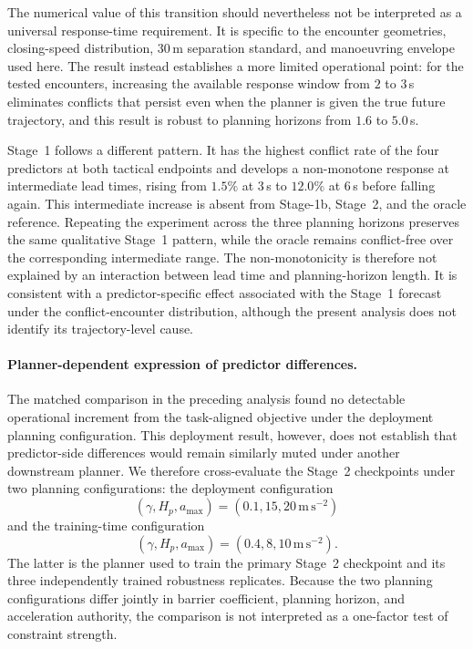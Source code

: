 \documentclass[11pt]{article}
\theoremstyle{plain}
\theoremstyle{definition}
\begin{document}
The numerical value of this transition should nevertheless not be
interpreted as a universal response-time requirement. It is specific
to the encounter geometries, closing-speed distribution, $30$\,m
separation standard, and manoeuvring envelope used here. The result
instead establishes a more limited operational point: for the tested
encounters, increasing the available response window from $2$ to
$3$\,s eliminates conflicts that persist even when the planner is
given the true future trajectory, and this result is robust to planning
horizons from $1.6$ to $5.0$\,s.

Stage~1 follows a different pattern. It has the highest conflict rate
of the four predictors at both tactical endpoints and develops a
non-monotone response at intermediate lead times, rising from
$1.5\%$ at $3$\,s to $12.0\%$ at $6$\,s before falling again.
This intermediate increase is absent from Stage-1b, Stage~2, and the
oracle reference. Repeating the experiment across the three planning
horizons preserves the same qualitative Stage~1 pattern, while the
oracle remains conflict-free over the corresponding intermediate
range. The non-monotonicity is therefore not explained by an
interaction between lead time and planning-horizon length. It is
consistent with a predictor-specific effect associated with the
Stage~1 forecast under the conflict-encounter distribution, although
the present analysis does not identify its trajectory-level cause.

\paragraph{Planner-dependent expression of predictor differences.}

The matched comparison in the preceding analysis found no detectable
operational increment from the task-aligned objective under the
deployment planning configuration. This deployment result, however,
does not establish that predictor-side differences would remain
similarly muted under another downstream planner. We therefore
cross-evaluate the Stage~2 checkpoints under two planning
configurations: the deployment configuration
\[
(\gamma,H_p,a_{\max})=(0.1,15,20\,\mathrm{m\,s^{-2}})
\]
and the training-time configuration
\[
(\gamma,H_p,a_{\max})=(0.4,8,10\,\mathrm{m\,s^{-2}}).
\]
The latter is the planner used to train the primary Stage~2 checkpoint
and its three independently trained robustness replicates. Because the
two planning configurations differ jointly in barrier coefficient,
planning horizon, and acceleration authority, the comparison is not
interpreted as a one-factor test of constraint strength.
\end{document}
